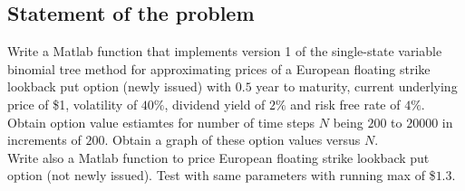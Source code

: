 \subsection*{Statement of the problem}
Write a Matlab function that implements version 1 of the single-state variable binomial tree method for approximating prices of a European floating strike lookback put option (newly issued) with $0.5$ year to maturity, current underlying price of \$1, volatility of $40\%$, dividend yield of $2\%$ and risk free rate of $4\%$. Obtain option value estiamtes for number of time steps $N$ being $200$ to $20000$ in increments of $200$. Obtain a graph of these option values versus $N$.\\
Write also a Matlab function to price European floating strike lookback put option (not newly issued). Test with same parameters with running max of \$$1.3$.

